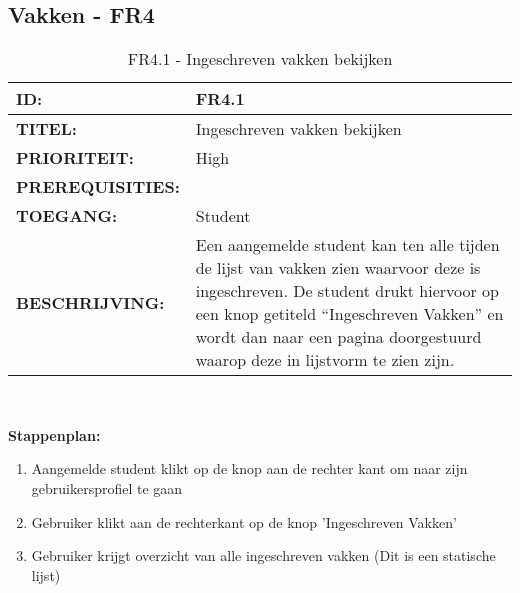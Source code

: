 \subsection{Vakken - FR4}

\noindent\begin{table}[H]
            \begin{tabular}{l | p{10cm}}
                \textbf{ID:} & FR4.1 \\ \hline
                \textbf{TITEL:} & Ingeschreven vakken bekijken\\ \hline
                \textbf{PRIORITEIT:} &  High \\ \hline
                \textbf{PREREQUISITIES:} & \\ \hline
                \textbf{TOEGANG:} &  Student \\ \hline
                \textbf{BESCHRIJVING:} & Een aangemelde student kan ten alle tijden de lijst van vakken zien waarvoor deze is ingeschreven. De student drukt hiervoor op een knop getiteld “Ingeschreven Vakken” en wordt dan naar een pagina doorgestuurd waarop deze in lijstvorm te zien zijn.\\
            \end{tabular}\\
            \caption{FR4.1 - Ingeschreven vakken bekijken}
            \label{tab:FR4.1 - Ingeschreven vakken bekijken}
        \end{table}  
        
\textbf{Stappenplan:}
	\begin{enumerate}
	\item Aangemelde student klikt op de knop aan de rechter kant om naar zijn gebruikersprofiel te gaan
	\item Gebruiker klikt aan de rechterkant op de knop 'Ingeschreven Vakken'
	\item Gebruiker krijgt overzicht van alle ingeschreven vakken (Dit is een statische lijst)
	\end{enumerate}

